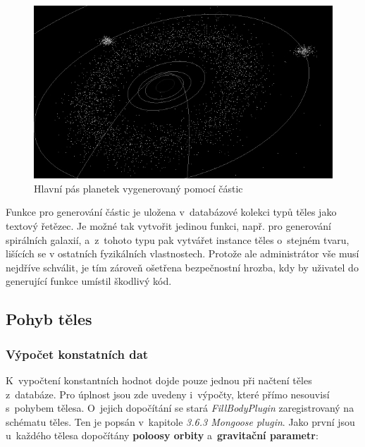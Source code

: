 \documentclass[a4paper,12pt]{article}
\begin{document}
\begin{figure}[H]
\begin{center}
\includegraphics[width=450pt]{Images/Particles.png}
\caption{Hlavní pás planetek vygenerovaný pomocí částic}
\end{center}
\end{figure}

Funkce pro generování částic je uložena v~databázové kolekci typů těles jako textový řetězec. Je možné tak vytvořit jedinou funkci, např. pro generování spirálních galaxií, a~z~tohoto typu pak vytvářet instance těles o~stejném tvaru, lišících se v ostatních fyzikálních vlastnostech. Protože ale administrátor vše musí nejdříve schválit, je tím zároveň ošetřena bezpečnostní hrozba, kdy by uživatel do generující funkce umístil škodlivý kód.



\subsection{Pohyb těles}

\subsubsection{Výpočet konstatních dat}

K~vypočtení konstantních hodnot dojde pouze jednou při načtení těles z~databáze. Pro úplnost jsou zde uvedeny i~výpočty, které přímo nesouvisí s~pohybem tělesa. O~jejich dopočítání se stará \textit{FillBodyPlugin} zaregistrovaný na schématu těles. Ten je popsán v~kapitole \textit{3.6.3 Mongoose plugin}. Jako první jsou u~každého tělesa dopočítány \textbf{poloosy orbity} a~\textbf{gravitační parametr}:
\end{document}
